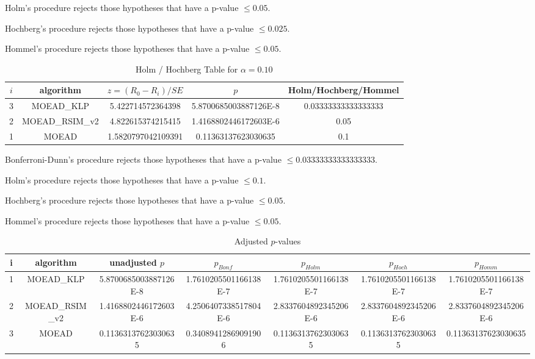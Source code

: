 \documentclass[a4paper,10pt]{article}
\begin{document}
\begin{landscape}
Holm's procedure rejects those hypotheses that have a p-value $\le0.05$.


Hochberg's procedure rejects those hypotheses that have a p-value $\le0.025$.


Hommel's procedure rejects those hypotheses that have a p-value $\le0.05$.


\begin{table}[!htp]
\centering\tiny
\caption{Holm / Hochberg Table for $\alpha=0.10$}
\begin{tabular}{ccccc}
$i$&algorithm&$z=(R_0 - R_i)/SE$&$p$&Holm/Hochberg/Hommel\\
\hline
3&MOEAD_KLP&5.422714572364398&5.8700685003887126E-8&0.03333333333333333\\
2&MOEAD_RSIM_v2&4.822615374215415&1.4168802446172603E-6&0.05\\
1&MOEAD&1.5820797042109391&0.11363137623030635&0.1\\
\hline
\end{tabular}
\end{table}
Bonferroni-Dunn's procedure rejects those hypotheses that have a p-value $\le0.03333333333333333$.


Holm's procedure rejects those hypotheses that have a p-value $\le0.1$.


Hochberg's procedure rejects those hypotheses that have a p-value $\le0.05$.


Hommel's procedure rejects those hypotheses that have a p-value $\le0.05$.


\begin{table}[!htp]
\centering\tiny
\caption{Adjusted $p$-values}
\begin{tabular}{ccccccc}
i&algorithm&unadjusted $p$&$p_{Bonf}$&$p_{Holm}$&$p_{Hoch}$&$p_{Homm}$\\
\hline
1&MOEAD_KLP&5.8700685003887126E-8&1.7610205501166138E-7&1.7610205501166138E-7&1.7610205501166138E-7&1.7610205501166138E-7\\
2&MOEAD_RSIM_v2&1.4168802446172603E-6&4.2506407338517804E-6&2.8337604892345206E-6&2.8337604892345206E-6&2.8337604892345206E-6\\
3&MOEAD&0.11363137623030635&0.34089412869091906&0.11363137623030635&0.11363137623030635&0.11363137623030635\\
\hline
\end{tabular}
\end{table}


\end{landscape}
\end{document}
